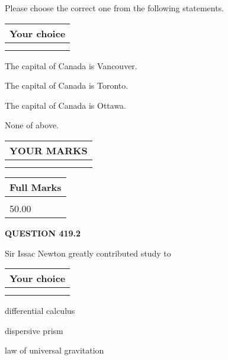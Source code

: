 \documentclass[12pt]{article}
\begin{document}
  
Please choose the correct one from the following statements.
  
  
\noindent\hspace{3.0in} \begin{tabular}{|l|}
\hline
Your choice \\
\hline
 \\ 
 \\ 
\hline
\end{tabular}
  
  
 
 
The capital of Canada is Vancouver.
 
 
The capital of Canada is Toronto.
 
 
The capital of Canada is Ottawa.
 
 
 None of above.
 
 
  
\vspace{0.2in}
  
\noindent\begin{tabular}{|l|}
\hline
 YOUR MARKS  \\
\hline
 \\ 
 \\ 
\hline
\end{tabular}
\hspace{0.05in} \begin{tabular}{|l|}
\hline
 Full Marks  \\
\hline
 \\ 
50.00 \\
\hline
\end{tabular}
{\textbf{\Large{QUESTION
419.2 
}}}
  
  
Sir Issac Newton greatly contributed study to
  
  
\noindent\hspace{3.0in} \begin{tabular}{|l|}
\hline
Your choice \\
\hline
 \\ 
 \\ 
\hline
\end{tabular}
  
  
 
 
differential calculus
 
 
dispersive prism
 
 
law of universal gravitation
 
\end{document}
